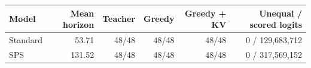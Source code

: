\begin{tabular}{lrrrrr}
\toprule
Model & Mean horizon & Teacher & Greedy & Greedy + KV & Unequal / scored logits \\
\midrule
Standard & 53.71 & 48/48 & 48/48 & 48/48 & 0 / 129,683,712 \\
SPS & 131.52 & 48/48 & 48/48 & 48/48 & 0 / 317,569,152 \\
\bottomrule
\end{tabular}
